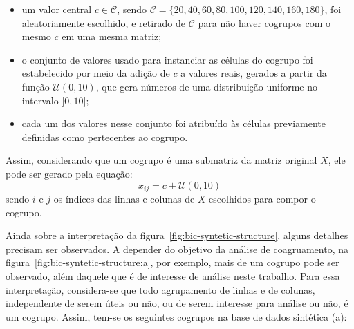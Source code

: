 \documentclass[
    12pt,                %
    oneside,            %
    a4paper,            %
    english,            %
    brazil                %
    ]{abntex2ppgsi}
\begin{document}

\begin{itemize}
    \item um valor central $c \in \mathcal{C}$, sendo $\mathcal{C} = \{ 20, 40, 60, 80, 100, 120, 140, 160, 180 \}$, foi aleatoriamente escolhido, e retirado de $\mathcal{C}$ para não haver cogrupos com o mesmo $c$ em uma mesma matriz;
    \item o conjunto de valores usado para instanciar as células do cogrupo foi estabelecido por meio da adição de $c$ a valores reais, gerados a partir da função $\mathcal{U}(0, 10)$, que gera números de uma distribuição uniforme no intervalo $]0, 10]$;
    \item cada um dos valores nesse conjunto foi atribuído às células previamente definidas como pertecentes ao cogrupo.
\end{itemize}

Assim, considerando que um cogrupo é uma submatriz da matriz original $X$, ele pode ser gerado pela equação:
\[
    x_{ij} = c + \mathcal{U}(0, 10)
\]
sendo $i$ e $j$ os índices das linhas e colunas de $X$ escolhidos para compor o cogrupo.

Ainda sobre a interpretação da figura~\ref{fig:bic-syntetic-structure}, alguns detalhes precisam ser observados.
A depender do objetivo da análise de coagruamento, na figura~\ref{fig:bic-syntetic-structure:a}, por exemplo, mais de um cogrupo pode ser observado, além daquele que é de interesse de análise neste trabalho.
Para essa interpretação, considera-se que todo agrupamento de linhas e de colunas, independente de serem úteis ou não, ou de serem interesse para análise ou não, é um cogrupo.
Assim, tem-se os seguintes cogrupos na base de dados sintética (a):
\end{document}
